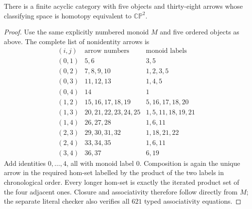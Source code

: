 \begin{theorem}
\label{A7:model38}
There is a finite acyclic category with five objects and thirty-eight
arrows whose classifying space is homotopy equivalent to
$\mathbb{CP}^2$.
\end{theorem}
\begin{proof}
Use the same explicitly numbered monoid $M$ and five ordered objects
as above. The complete list of nonidentity arrows is
\[
\begin{array}{c|c|l}
(i,j)&\text{arrow numbers}&\text{monoid labels}\\\hline
(0,1)&5,6&3,5\\
(0,2)&7,8,9,10&1,2,3,5\\
(0,3)&11,12,13&1,4,5\\
(0,4)&14&1\\
(1,2)&15,16,17,18,19&5,16,17,18,20\\
(1,3)&20,21,22,23,24,25&1,5,11,18,19,21\\
(1,4)&26,27,28&1,6,11\\
(2,3)&29,30,31,32&1,18,21,22\\
(2,4)&33,34,35&1,6,11\\
(3,4)&36,37&6,19
\end{array}
\]
Add identities $0,\ldots,4$, all with monoid label $0$.
Composition is again the unique arrow in the required hom-set
labelled by the product of the two labels in chronological order.
Every longer hom-set is exactly the iterated product set of the
four adjacent ones. Closure and associativity therefore follow
directly from $M$; the separate literal checker also verifies all
$621$ typed associativity equations.


\end{proof}
